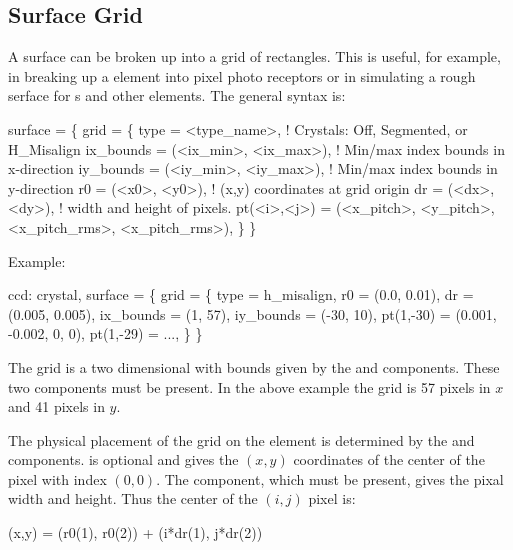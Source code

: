 \subsection{Surface Grid}
\label{s:surf.grid}

A surface can be broken up into a grid of rectangles. This is useful,
for example, in breaking up a  element into pixel photo
receptors or in simulating a rough serface for s and other
elements. The general syntax is:
\begin{example}
  surface = \{
    grid = \{                
      type = <type_name>,                ! Crystals: Off, Segmented, or H_Misalign
      ix_bounds = (<ix_min>, <ix_max>),  ! Min/max index bounds in x-direction
      iy_bounds = (<iy_min>, <iy_max>),  ! Min/max index bounds in y-direction
      r0 = (<x0>, <y0>),                 ! (x,y) coordinates at grid origin
      dr = (<dx>, <dy>),                 ! width and height of pixels.
      pt(<i>,<j>) = (<x_pitch>, <y_pitch>, <x_pitch_rms>, <x_pitch_rms>),
          \} \}
\end{example}
Example:
\begin{example}
  ccd: crystal, surface = \{
          grid = \{
            type = h_misalign,
            r0 = (0.0, 0.01), dr = (0.005, 0.005),
            ix_bounds = (1, 57), iy_bounds = (-30, 10),
            pt(1,-30) = (0.001, -0.002, 0, 0), 
            pt(1,-29) = ..., 
          \} \}
\end{example}

The grid is a two dimensional with bounds given by the 
and  components. These two components must be present. In
the above example the grid is 57 pixels in $x$ and 41 pixels in $y$.

The physical placement of the grid on the element is determined by the
 and  components.  is optional and gives the
$(x,y)$ coordinates of the center of the pixel with index $(0,0)$. The
 component, which must be present, gives the pixal width and
height. Thus the center of the $(i,j)$ pixel is:
\begin{example}
  (x,y) = (r0(1), r0(2)) + (i*dr(1), j*dr(2))
\end{example}

